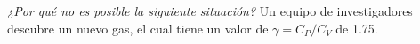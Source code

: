 \item \textit{¿Por qué no es posible la siguiente situación?} Un equipo de investigadores descubre un nuevo gas, el cual tiene un valor de $\gamma = C_P/C_V$ de 1.75.
